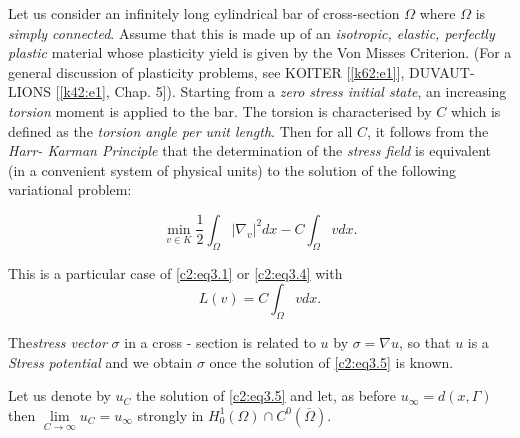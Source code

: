  Let us consider an infinitely long cylindrical bar of cross-section
 $\Omega$ where $\Omega$ is \textit{simply connected}. Assume that
 this is made up of an \textit{isotro\-pic, elastic, perfectly plastic}
 material whose plasticity yield is given by the Von Misses
 Criterion. (For a general discussion of plasticity problems, see
 KOITER [\ref{k62:e1}], DUVAUT-LIONS [\ref{k42:e1},
   Chap. 5]). Starting from a \textit{zero 
   stress initial state}, an increasing \textit{torsion} moment is
 applied to the bar. The torsion is characterised by $C$ which is
 defined as the \textit{torsion angle per unit length}. Then for all
 $C$, it follows from the \textit{Harr- Karman Principle} that the
 determination of the \textit{stress field} is equivalent (in a
 convenient system of physical units) to the solution of the following
 variational problem:  

\begin{equation}
\min_{v \in K} \frac{1}{2} \int_\Omega |\nabla _v |^2
dx - C \int_\Omega v dx.\tag{3.5}\label{c2:eq3.5} 
\end{equation}  
  
This is a particular case of \eqref{c2:eq3.1} 
or \eqref{c2:eq3.4} with 
\begin{equation}
L (v) = C \int_\Omega v dx.\tag{3.6}
\end{equation} 
  
 The\pageoriginale  \textit{stress vector} $\sigma$ in a cross - section  is related
 to $u$ by $\sigma = \nabla u$, so that $u$ is a
 \textit{Stress potential} and we obtain $\sigma$ once the solution of
 \eqref{c2:eq3.5} is known.  
  
\begin{proposition}\label{c2:prop3.2}%
Let us denote by $u_C$ the solution of \eqref{c2:eq3.5} and let, as before
$u_\infty =  d(x, \Gamma)$ then $\lim\limits_{C \to \infty} u_C =
u_\infty$ strongly in $H^1_0 (\Omega) \cap C^0 (\overline{\Omega})$. 
\end{proposition} 
  
